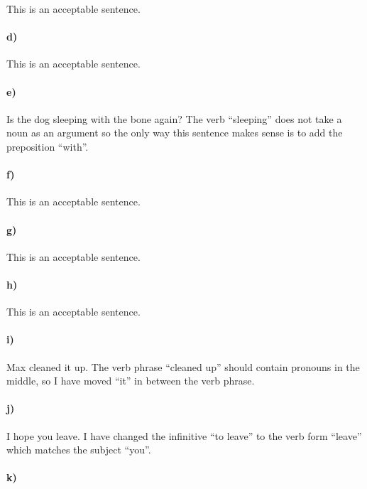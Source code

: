 \documentclass[12pt]{article}
\begin{document}
This is an acceptable sentence.

\paragraph{d)}

This is an acceptable sentence.

\paragraph{e)}

Is the dog sleeping with the bone again? The verb ``sleeping'' does not take a noun as an argument so the only
way this sentence makes sense is to add the preposition ``with''.

\paragraph{f)}

This is an acceptable sentence.

\paragraph{g)}

This is an acceptable sentence.

\paragraph{h)}

This is an acceptable sentence.

\paragraph{i)}

Max cleaned it up. The verb phrase ``cleaned up'' should contain pronouns in the middle, so I have moved ``it'' in between the
verb phrase.

\paragraph{j)}

I hope you leave. I have changed the infinitive ``to leave'' to the verb form ``leave'' which matches the subject ``you''.

\paragraph{k)}
\end{document}
